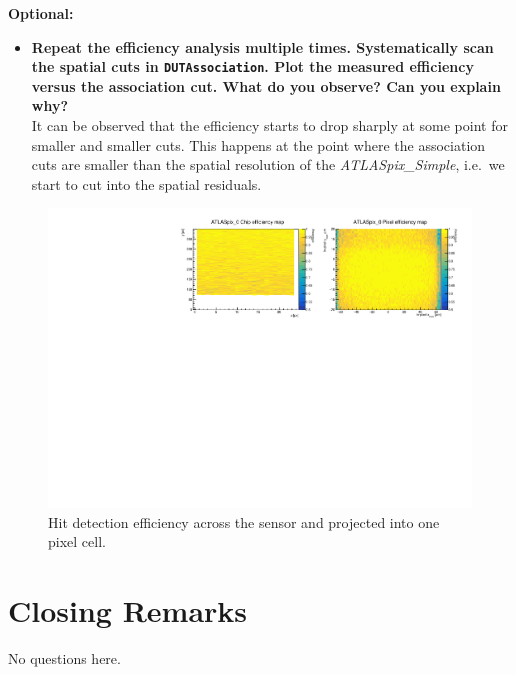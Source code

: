 \documentclass[a4paper,11pt]{article}
\newcommand*{\apx}{\emph{ATLASpix\_Simple}\xspace}
\newcommand*{\module}[1]{\texttt{#1}}
\begin{document}
\textbf{Optional:} 
\begin{itemize}
\item \textbf{Repeat the efficiency analysis multiple times. Systematically scan the spatial cuts in \module{DUTAssociation}.
Plot the measured efficiency versus the association cut.
What do you observe? Can you explain why?}\\
It can be observed that the efficiency starts to drop sharply at some point for smaller and smaller cuts.
This happens at the point where the association cuts are smaller than the spatial resolution of the \apx, i.e.~we start to cut into the spatial residuals.
\end{itemize}

\begin{figure}[!htb]
\centering
\includegraphics[width=\textwidth]{12_efficiency}
\caption{Hit detection efficiency across the sensor and projected into one pixel cell.}
\label{fig:12_efficiency}
\end{figure}

\section{Closing Remarks}
No questions here.
\end{document}
